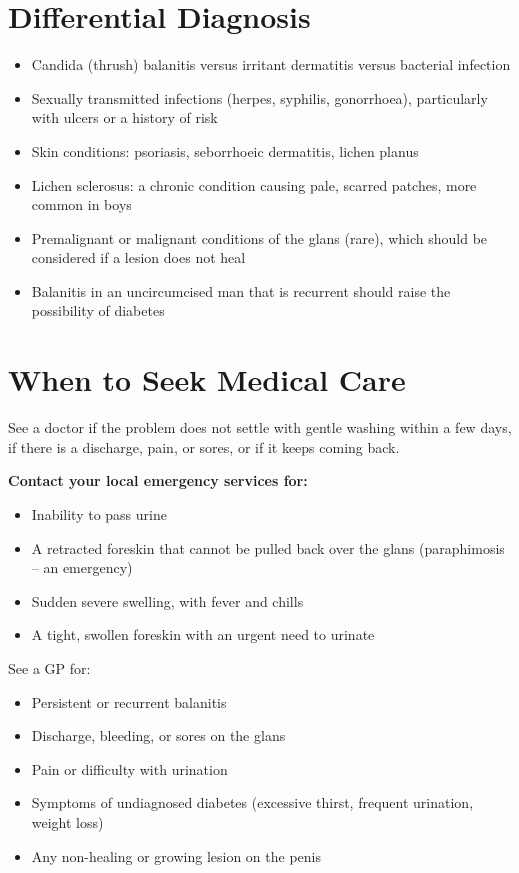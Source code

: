\section*{Differential Diagnosis}
\begin{itemize}
    \item Candida (thrush) balanitis versus irritant dermatitis versus bacterial infection
    \item Sexually transmitted infections (herpes, syphilis, gonorrhoea), particularly with ulcers or a history of risk
    \item Skin conditions: psoriasis, seborrhoeic dermatitis, lichen planus
    \item Lichen sclerosus: a chronic condition causing pale, scarred patches, more common in boys
    \item Premalignant or malignant conditions of the glans (rare), which should be considered if a lesion does not heal
    \item Balanitis in an uncircumcised man that is recurrent should raise the possibility of diabetes
\end{itemize}

\section*{When to Seek Medical Care}
See a doctor if the problem does not settle with gentle washing within a few days, if there is a discharge, pain, or sores, or if it keeps coming back.

\textbf{Contact your local emergency services for:}
\begin{itemize}
    \item Inability to pass urine
    \item A retracted foreskin that cannot be pulled back over the glans (paraphimosis -- an emergency)
    \item Sudden severe swelling, with fever and chills
    \item A tight, swollen foreskin with an urgent need to urinate
\end{itemize}

See a GP for:
\begin{itemize}
    \item Persistent or recurrent balanitis
    \item Discharge, bleeding, or sores on the glans
    \item Pain or difficulty with urination
    \item Symptoms of undiagnosed diabetes (excessive thirst, frequent urination, weight loss)
    \item Any non-healing or growing lesion on the penis
\end{itemize}

